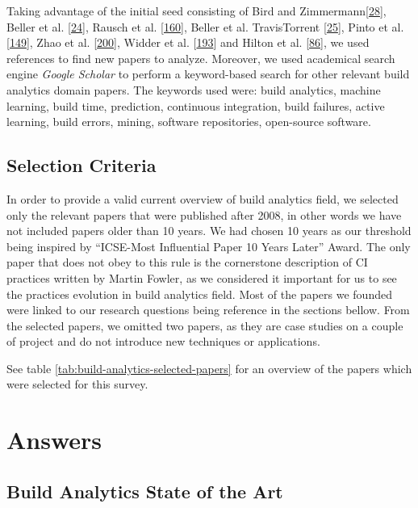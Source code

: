 \documentclass[]{book}
\begin{document}
Taking advantage of the initial seed consisting of Bird and
Zimmermann{[}\protect\hyperlink{ref-bird2017predicting}{28}{]}, Beller
et al. {[}\protect\hyperlink{ref-beller2017oops}{24}{]}, Rausch et al.
{[}\protect\hyperlink{ref-rausch2017empirical}{160}{]}, Beller et al.
TravisTorrent {[}\protect\hyperlink{ref-beller2017travistorrent}{25}{]},
Pinto et al. {[}\protect\hyperlink{ref-pinto2018work}{149}{]}, Zhao et
al. {[}\protect\hyperlink{ref-zhao2017impact}{200}{]}, Widder et al.
{[}\protect\hyperlink{ref-widder2018m}{193}{]} and Hilton et al.
{[}\protect\hyperlink{ref-hilton2016usage}{86}{]}, we used references to
find new papers to analyze. Moreover, we used academical search engine
\emph{Google Scholar} to perform a keyword-based search for other
relevant build analytics domain papers. The keywords used were: build
analytics, machine learning, build time, prediction, continuous
integration, build failures, active learning, build errors, mining,
software repositories, open-source software.

\subsection{Selection Criteria}\label{selection-criteria}

In order to provide a valid current overview of build analytics field,
we selected only the relevant papers that were published after 2008, in
other words we have not included papers older than 10 years. We had
chosen 10 years as our threshold being inspired by ``ICSE-Most
Influential Paper 10 Years Later'' Award. The only paper that does not
obey to this rule is the cornerstone description of CI practices written
by Martin Fowler, as we considered it important for us to see the
practices evolution in build analytics field. Most of the papers we
founded were linked to our research questions being reference in the
sections bellow. From the selected papers, we omitted two papers, as
they are case studies on a couple of project and do not introduce new
techniques or applications.

See table \ref{tab:build-analytics-selected-papers} for an overview of
the papers which were selected for this survey.

\section{Answers}\label{answers}

\subsection{Build Analytics State of the
Art}\label{build-analytics-state-of-the-art}
\end{document}
